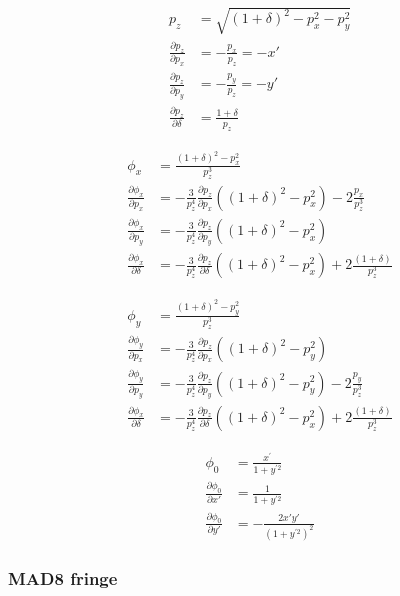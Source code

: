 \begin{align}
p_z &= \sqrt{(1+\delta)^2 - p_x^2 - p_y^2}\\
\frac{\partial p_z}{\partial p_x} &= -\frac{p_x}{p_z} = -x'\\
\frac{\partial p_z}{\partial p_y} &= -\frac{p_y}{p_z} = -y'\\
\frac{\partial p_z}{\partial \delta} &= \frac{1+\delta}{p_z}
\end{align}


\begin{align}
\phi_x &= \frac{(1+\delta)^2-p_x^2}{p_z^3}\\
\frac{\partial \phi_x}{\partial p_x} &=  -\frac{3}{p_z^4}\frac{\partial p_z}{\partial p_x} \left((1+\delta)^2-p_x^2 \right)
- 2 \frac{p_x}{p_z^3}\\
\frac{\partial \phi_x}{\partial p_y} &= -\frac{3}{p_z^4}\frac{\partial p_z}{\partial p_y} \left((1+\delta)^2-p_x^2 \right)\\
\frac{\partial \phi_x}{\partial \delta} &= -\frac{3}{p_z^4}\frac{\partial p_z}{\partial \delta} \left((1+\delta)^2-p_x^2 \right)
+ 2 \frac{(1+\delta)}{p_z^3}
\end{align}

\begin{align}
\phi_y &= \frac{(1+\delta)^2-p_y^2}{p_z^3}\\
\frac{\partial \phi_y}{\partial p_x} &=  -\frac{3}{p_z^4}\frac{\partial p_z}{\partial p_x} \left((1+\delta)^2-p_y^2 \right)\\
\frac{\partial \phi_y}{\partial p_y} &= -\frac{3}{p_z^4}\frac{\partial p_z}{\partial p_y} \left((1+\delta)^2-p_y^2 \right)
- 2 \frac{p_y}{p_z^3}\\
\frac{\partial \phi_x}{\partial \delta} &= -\frac{3}{p_z^4}\frac{\partial p_z}{\partial \delta} \left((1+\delta)^2-p_x^2 \right)
+ 2 \frac{(1+\delta)}{p_z^3}
\end{align}

\begin{align}
\phi_0 &= \frac{x^{\prime}}{1+y^{\prime 2}}\\
\frac{\partial \phi_0}{\partial x'} &= \frac{1}{1+y^{\prime 2}}\\
\frac{\partial \phi_0}{\partial y'} &= - \frac{2x'y'}{(1+y^{\prime 2})^2}
\end{align}

\subsubsection{MAD8 fringe}

